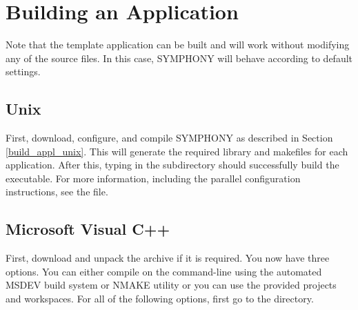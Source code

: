 
\section{Building an Application}
\label{building_custom_app}

Note that the template application can be built and will work without
modifying any of the source files. In this case, SYMPHONY will behave
according to default settings. 

\subsection{Unix}

First, download, configure, and compile SYMPHONY as described in Section
\ref{build_appl_unix}. This will generate the required library and makefiles
for each application. After this, typing  in the
 subdirectory should successfully build the
executable. For more information, including the parallel configuration
instructions, see the  file.

\subsection{Microsoft Visual C++}

First, download  and unpack the archive if it is
required. You now have three options. You can either compile on the
command-line using the automated MSDEV build system or NMAKE utility or you
can use the provided projects and workspaces. For all of the following
options, first go to the  directory.

